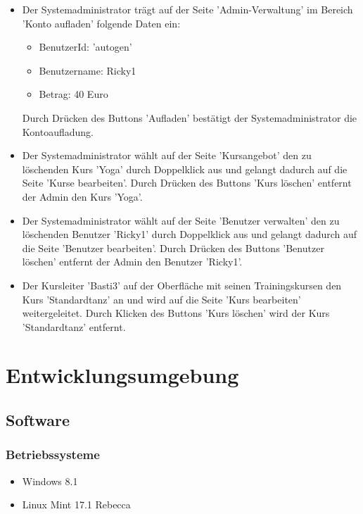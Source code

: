 \documentclass[a4paper]{scrreprt}
\begin{document}
\begin{itemize}
				\item {}
				Der Systemadministrator trägt auf der Seite 'Admin-Verwaltung' im Bereich 'Konto aufladen' folgende Daten ein:
					\begin{itemize}
						\item BenutzerId: 'autogen'
						\item Benutzername: Ricky1
						\item Betrag: 40 Euro
					\end{itemize}
				Durch Drücken des Buttons 'Aufladen' bestätigt der Systemadministrator die Kontoaufladung.
				
				\item {}
				Der Systemadministrator wählt auf der Seite 'Kursangebot' den zu löschenden Kurs 'Yoga' durch Doppelklick aus und gelangt dadurch auf die Seite 'Kurse bearbeiten'. Durch Drücken des Buttons 'Kurs löschen' entfernt der Admin den Kurs 'Yoga'.
				
				
				\item {}
				Der Systemadministrator wählt auf der Seite 'Benutzer verwalten' den zu löschenden Benutzer 'Ricky1' durch Doppelklick aus und gelangt dadurch auf die Seite 'Benutzer bearbeiten'. Durch Drücken des Buttons 'Benutzer löschen' entfernt der Admin den Benutzer 'Ricky1'.
				
				\item {}
				Der Kursleiter 'Basti3' auf der Oberfläche mit seinen Trainingskursen den Kurs 'Standardtanz' an und wird auf die Seite 'Kurs bearbeiten' weitergeleitet. Durch Klicken des Buttons 'Kurs löschen' wird der Kurs 'Standardtanz' entfernt. 
				
			\end{itemize}





\chapter{Entwicklungsumgebung}
    \section{Software}
        \subsection{Betriebssysteme}
            \begin{itemize}
            	\item Windows 8.1
            	\item Linux Mint 17.1 Rebecca
            \end{itemize}	
            
\end{document}
